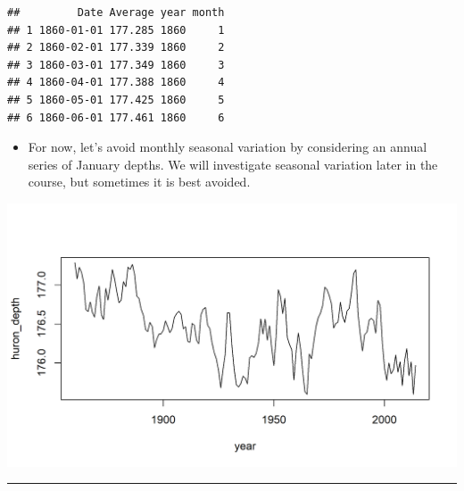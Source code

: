 \documentclass[]{article}
\newenvironment{Shaded}{\begin{snugshade}}{\end{snugshade}}
\newcommand{\KeywordTok}[1]{\textcolor[rgb]{0.13,0.29,0.53}{\textbf{#1}}}
\newcommand{\DataTypeTok}[1]{\textcolor[rgb]{0.13,0.29,0.53}{#1}}
\newcommand{\DecValTok}[1]{\textcolor[rgb]{0.00,0.00,0.81}{#1}}
\newcommand{\StringTok}[1]{\textcolor[rgb]{0.31,0.60,0.02}{#1}}
\newcommand{\OperatorTok}[1]{\textcolor[rgb]{0.81,0.36,0.00}{\textbf{#1}}}
\newcommand{\NormalTok}[1]{#1}
\providecommand{\tightlist}{%
  \setlength{\itemsep}{0pt}\setlength{\parskip}{0pt}}
\begin{document}
\begin{verbatim}
##         Date Average year month
## 1 1860-01-01 177.285 1860     1
## 2 1860-02-01 177.339 1860     2
## 3 1860-03-01 177.349 1860     3
## 4 1860-04-01 177.388 1860     4
## 5 1860-05-01 177.425 1860     5
## 6 1860-06-01 177.461 1860     6
\end{verbatim}

\begin{itemize}
\tightlist
\item
  For now, let's avoid monthly seasonal variation by considering an
  annual series of January depths. We will investigate seasonal
  variation later in the course, but sometimes it is best avoided.
\end{itemize}

\begin{Shaded}
\end{Shaded}

\begin{center}\includegraphics{figure/intro-select_annual-1} \end{center}

\begin{center}\rule{0.5\linewidth}{\linethickness}\end{center}
\end{document}

